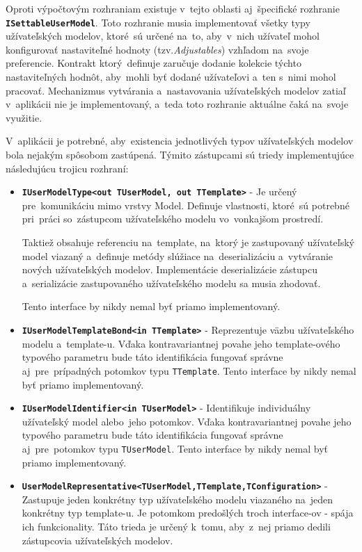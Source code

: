 Oproti výpočtovým rozhraniam existuje v~tejto oblasti aj~špecifické rozhranie \textbf{\texttt{ISettableUserModel}}. Toto rozhranie musia implementovať všetky typy užívateľských modelov, ktoré~sú určené na~to, aby~v~nich užívateľ mohol konfigurovať nastaviteľné hodnoty (tzv.\textit{Adjustables}) vzhľadom na~svoje preferencie. Kontrakt ktorý~definuje zaručuje dodanie kolekcie týchto nastaviteľných hodnôt, aby~mohli byť dodané užívateľovi a~ten s~nimi mohol pracovať. Mechanizmus vytvárania a~nastavovania užívateľských modelov zatiaľ v~aplikácii nie je implementovaný, a~teda toto rozhranie aktuálne čaká na~svoje využitie.  

\bigskip

V~aplikácii je potrebné, aby~existencia jednotlivých typov užívateľských modelov bola nejakým spôsobom zastúpená. Týmito zástupcami sú triedy implementujúce následujúcu trojicu rozhraní:
\begin{itemize}
    \item \textbf{\texttt{IUserModelType<out TUserModel, out TTemplate>}} - Je určený pre~komunikáciu mimo vrstvy Model. Definuje vlastnosti, ktoré~sú potrebné pri~práci so~zástupcom užívateľského modelu vo~vonkajšom prostredí. 
    
    Taktiež obsahuje referenciu na~template, na~ktorý je zastupovaný užívateľský model viazaný a~definuje metódy slúžiace na~deserializáciu a~vytváranie nových užívateľských modelov. Implementácie deserializácie zástupcu a~serializácie zastupovaného užívateľského modelu sa musia zhodovať. 
    
    Tento interface by nikdy nemal byť priamo implementovaný.
    \item \textbf{\texttt{IUserModelTemplateBond<in TTemplate>}} - Reprezentuje väzbu užívateľského modelu a~template-u. Vďaka kontravariantnej povahe jeho template-ového typového parametru bude táto identifikácia fungovať správne aj~pre~prípadných potomkov typu \texttt{TTemplate}. Tento interface by nikdy nemal byť priamo implementovaný.
    \item \textbf{\texttt{IUserModelIdentifier<in TUserModel>}} - Identifikuje individuálny užívateľský model alebo~jeho potomkov. Vďaka kontravariantnej povahe jeho typového parametru bude táto identifikácia fungovať správne aj~pre~potomkov typu \texttt{TUserModel}. Tento interface by nikdy nemal byť priamo implementovaný.
    \item \textbf{\texttt{UserModelRepresentative<TUserModel,TTemplate,TConfiguration>}} - Zastupuje jeden konkrétny typ užívateľského modelu viazaného na~jeden konkrétny typ template-u. Je potomkom predošlých troch interface-ov - spája ich funkcionality. Táto trieda je určený k~tomu, aby~z~nej priamo dedili zástupcovia užívateľských modelov.   
\end{itemize}

